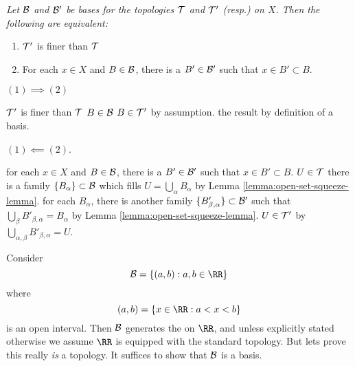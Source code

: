  {\itshape
Let $\mathcal{B}$ and $\mathcal{B'}$ be bases for the topologies
$\mathcal{T}$ and $\mathcal{T'}$ (resp.) on $X$. Then the following
are equivalent:
\begin{enumerate}
\item $\mathcal{T'}$ is finer than $\mathcal{T}$
\item For each $x\in X$ and $B\in\mathcal{B}$, there is a
  $B'\in\mathcal{B'}$ such that $x\in B'\subset B$.
\end{enumerate}
}

\begin{spf}
  \step $(1)\implies(2)$
  \begin{spf}
    \Assume $\mathcal{T'}$ is finer than $\mathcal{T}$
    \Let $B\in\mathcal{B}$
    \Then $B\in\mathcal{T'}$ by assumption.
    \Hence the result by definition of a basis.
  \end{spf}
  \step $(1)\impliedby(2)$.
  \begin{spf}
    \Assume for each $x\in X$ and $B\in\mathcal{B}$, there is a
    $B'\in\mathcal{B'}$ such that $x\in B'\subset B$.
    \Let $U\in\mathcal{T}$
    \Then there is a family $\{B_{\alpha}\}\subset\mathcal{B}$ which
    fills $U=\bigcup_{\alpha}B_{\alpha}$ by Lemma \ref{lemma:open-set-squeeze-lemma}.
    \Then for each $B_{\alpha}$, there is another family
    $\{B'_{\beta,\alpha}\}\subset\mathcal{B'}$ such that
    $\bigcup_{\beta}B'_{\beta,\alpha}=B_{\alpha}$ by Lemma \ref{lemma:open-set-squeeze-lemma}.
    \Hence $U\in\mathcal{T'}$ by $\bigcup_{\alpha,\beta}B'_{\beta,\alpha}=U$.\placeQED
  \end{spf}
\end{spf}

Consider
\begin{equation}
  \topology{B} = \{(a,b) : a,b\in\RR\}
\end{equation}
where
\begin{equation}
  (a,b) = \{x\in\RR : a<x<b\}
\end{equation}
is an open interval. Then $\mathcal{B}$ generates the
 on $\RR$, and unless explicitly stated
otherwise we assume $\RR$ is equipped with the standard topology. But
lets prove this really \emph{is} a topology. It suffices to show that
$\mathcal{B}$ is a basis.

